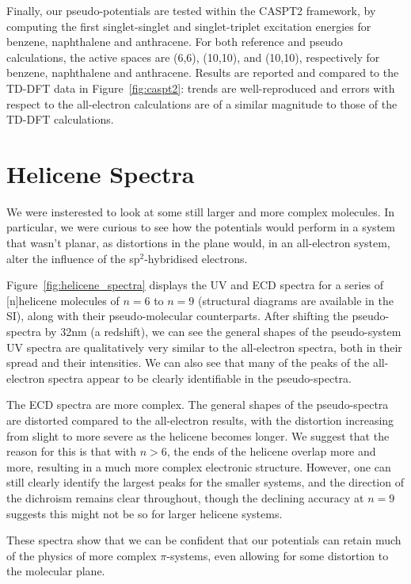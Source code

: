 \documentclass[12pt]{article}
\begin{document}
Finally, our pseudo-potentials are tested within the CASPT2 framework, by computing the first 
singlet-singlet and singlet-triplet excitation energies for benzene, naphthalene and anthracene. 
For both reference and pseudo calculations,
the active spaces are (6,6), (10,10), and (10,10), respectively for benzene, naphthalene and anthracene. 
Results are reported and compared to the TD-DFT data in Figure~\ref{fig:caspt2}: trends 
are well-reproduced and errors with respect to the all-electron calculations are of a similar magnitude
to those of the TD-DFT calculations. 

\section*{\sffamily \large Helicene Spectra}

We were insterested to look at some still larger and more complex molecules.
In particular, we were curious to see how the potentials would perform in a system that wasn't planar,
as distortions in the plane would, in an all-electron system, alter the influence of the sp$^2$-hybridised electrons.

Figure~\ref{fig:helicene_spectra} displays the UV and ECD spectra for a series of [n]helicene molecules of $n=6$ to $n=9$ (structural diagrams are available in the SI), along with their pseudo-molecular counterparts. After shifting the pseudo-spectra by 32nm (a redshift), we can see the general shapes of the pseudo-system UV spectra are qualitatively very similar to the all-electron spectra, both in their spread and their intensities. We can also see that many of the peaks of the all-electron spectra appear to be clearly identifiable in the pseudo-spectra. 

The ECD spectra are more complex. The general shapes of the pseudo-spectra are distorted compared to the all-electron results, with the distortion increasing from slight to more severe as the helicene becomes longer. We suggest that the reason for this is that with $n > 6$, the ends of the helicene overlap more and more, resulting in a much more complex electronic structure. However, one can still clearly identify the largest peaks for the smaller systems, and the direction of the dichroism remains clear throughout, though the declining accuracy at $n=9$ suggests this might not be so for larger helicene systems.

These spectra show that we can be confident that our potentials can retain much of the physics of more complex $\pi$-systems, even allowing for some distortion to the molecular plane.
\end{document}
